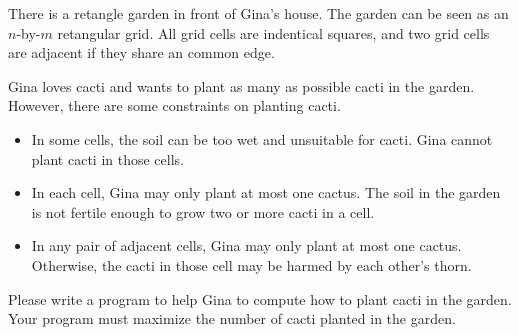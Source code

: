 There is a retangle garden in front of Gina's house.
The garden can be seen as an $n$-by-$m$ retangular grid.
All grid cells are indentical squares, and two grid cells are adjacent 
if they share an common edge.

Gina loves cacti and wants to plant as many as possible cacti in the garden.
However, there are some constraints on planting cacti.
\begin{itemize}
\item In some cells, the soil can be too wet and unsuitable for cacti.
Gina cannot plant cacti in those cells.
\item In each cell, Gina may only plant at most one cactus. The soil in the 
garden is not fertile enough to grow two or more cacti in a cell.
\item In any pair of adjacent cells, Gina may only plant at most one cactus.
Otherwise, the cacti in those cell may be harmed by each other's thorn.
\end{itemize}

Please write a program to help Gina to compute how to plant cacti in the garden.
Your program must maximize the number of cacti planted in the garden.
